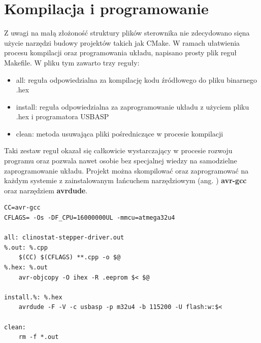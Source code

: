 \section{Kompilacja i programowanie}

Z uwagi na małą złożoność struktury plików sterownika nie zdecydowano się\linebreak na użycie narzędzi budowy projektów takich jak CMake. W ramach ułatwienia procesu kompilacji oraz programowania układu, napisano prosty plik reguł Makefile. W pliku tym zawarto trzy reguły:
\begin{itemize}
	\item all: reguła odpowiedzialna za kompilację kodu źródłowego do pliku binarnego .hex
	\item install: reguła odpowiedzialna za zaprogramowanie układu z użyciem pliku .hex i programatora USBASP
	\item clean: metoda usuwająca pliki pośredniczące w procesie kompilacji
\end{itemize}
Taki zestaw reguł okazał się całkowicie wystarczający w procesie rozwoju programu oraz pozwala nawet osobie bez specjalnej wiedzy na samodzielne zaprogramowanie układu. Projekt można skompilować oraz zaprogramować na każdym systemie z zainstalowanym łańcuchem narzędziowym (ang. ) \textbf{avr-gcc} oraz narzędziem \textbf{avrdude}.

\begin{lstlisting}[caption=Makefile sterownika.]
CC=avr-gcc
CFLAGS= -Os -DF_CPU=16000000UL -mmcu=atmega32u4

all: clinostat-stepper-driver.out
%.out: %.cpp
	$(CC) $(CFLAGS) **.cpp -o $@
%.hex: %.out
	avr-objcopy -O ihex -R .eeprom $< $@

install.%: %.hex
	avrdude -F -V -c usbasp -p m32u4 -b 115200 -U flash:w:$<

clean:
	rm -f *.out
\end{lstlisting}